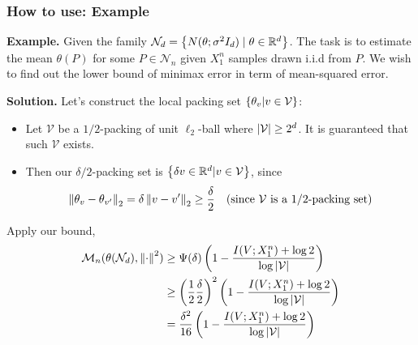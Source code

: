\documentclass[10pt,xcolor={usenames,dvipsnames,table},aspectratio=169]{beamer}
\begin{document}
\begin{frame}
    \frametitle{How to use: Example}
    \textbf{Example. }
    Given the family $\mathcal{N}_d =\left\{N(\theta; \sigma^2 I_d) \mid \theta \in \mathbb{R}^{d}\right\}$. The task is to estimate the mean $\theta(P)$ for some $P \in \mathcal{N}_n$ given $X_1^{n}$ samples drawn i.i.d from $P$. We wish to find out the lower bound of minimax error in term of mean-squared error. 

    \textbf{Solution.}
    Let's construct the local packing set $\left\{\theta_v | v \in \mathcal{V}\right\}$:

    \begin{itemize}
        \item Let $\mathcal{V}$ be a $1/2$-packing of unit  $\ell_2$-ball where $\left\lvert\mathcal{V}\right\rvert \geq 2^{d}$. It is guaranteed that such $\mathcal{V}$ exists.
        \item Then our $\delta/2$-packing set is $\left\{\delta v \in \mathbb{R}^{d} | v \in \mathcal{V}\right\}$, since
    \[
    \left\lVert\theta_v - \theta_{v'}\right\rVert_2 = \delta \left\lVert v - v'\right\rVert_2 \geq \dfrac{\delta}{2} \quad \text{(since $\mathcal{V}$ is a 1/2-packing set)}
    \] 
    \end{itemize}
    Apply our bound,
    \begin{align*}
        \mathcal{M}_n(\theta(\mathcal{N}_d), \left\lVert\cdot\right\rVert^2) 
        &\geq \Psi(\delta) \left( 1- \dfrac{I(V; X_1^{n}) +\log 2}{ \log \left\lvert\mathcal{V}\right\rvert} \right)\\
        &\geq \left( \dfrac{1}{2} \dfrac{\delta}{2} \right)^2 \left( 1- \dfrac{I(V;X_1^{n}) + \log 2}{\log \left\lvert\mathcal{V}\right\rvert} \right) \\
        &= \dfrac{\delta^2}{16} \left( 1- \dfrac{I(V;X_1^{n}) + \log 2}{\log \left\lvert\mathcal{V}\right\rvert} \right)
    \end{align*}
\end{frame}
\end{document}
